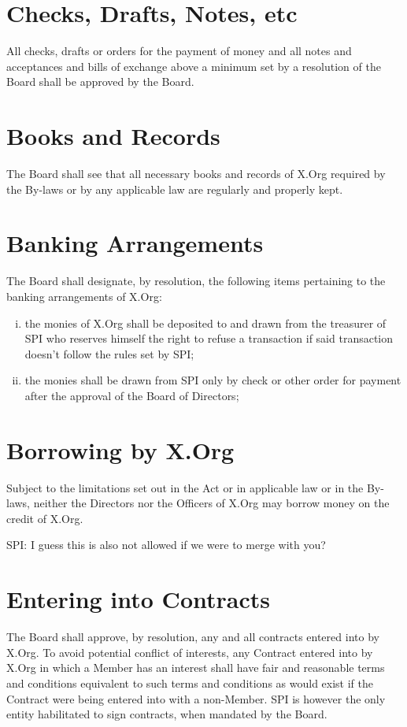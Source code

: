\documentclass[10pt, english]{bylaws}
\begin{document}
\section{Checks, Drafts, Notes, etc}
All checks, drafts or orders for the payment of money and all notes and
acceptances
and bills of exchange above a minimum set by a resolution of the Board shall be
approved by the Board.

\section{Books and Records}
The Board shall see that all necessary books and records of X.Org required by
the By-laws or by any applicable law are regularly and properly kept.

\section{Banking Arrangements}
The Board shall designate, by resolution, the following items pertaining to the
banking arrangements of X.Org:

\begin{enumerate}[(i)\hspace{.2cm}]
	\item the monies of X.Org shall be deposited to and drawn from the
	treasurer of SPI who reserves himself the right to refuse a transaction
	if said transaction doesn't follow the rules set by SPI;

	\item the monies shall be drawn from SPI only by check or other order
	for payment after the approval of the Board of Directors;
\end{enumerate}

\section{Borrowing by X.Org}
Subject to the limitations set out in the Act or in applicable law or in the
By-laws, neither the Directors nor the Officers of X.Org may borrow money on the
credit of X.Org.

SPI: I guess this is also not allowed if we were to merge with you?

\section{Entering into Contracts}
\label{section_entering_contracts}
The Board shall approve, by resolution, any and all contracts entered into by
X.Org. To avoid potential conflict of interests, any Contract entered into by
X.Org in which a Member has an interest shall have fair and reasonable terms and
conditions equivalent to such terms and conditions as would exist if the
Contract were being entered into with a non-Member. SPI is however the only
entity habilitated to sign contracts, when mandated by the Board.
\end{document}
